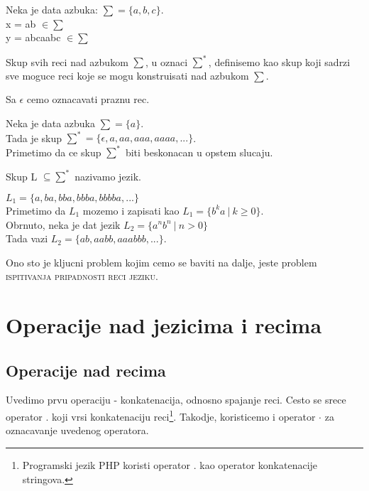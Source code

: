 \documentclass{memoir}
\begin{document}
\begin{primer}
Neka je data azbuka: $\sum = \{a, b, c \}$. \\
x = ab $\in \sum$ \\
y = abcaabc $\in \sum$ \\
\end{primer}

\begin{definicija}
 Skup svih reci nad azbukom $\sum$, u oznaci $\sum^*$, definisemo kao skup koji sadrzi sve moguce
 reci koje se mogu konstruisati nad azbukom $\sum$. 
\end{definicija}

Sa $\epsilon$ cemo oznacavati praznu rec.

\begin{primer}
 Neka je data azbuka $\sum = \{a\}$. \\
 Tada je skup $\sum^* = \{\epsilon, a, aa, aaa, aaaa, ... \}$.\\
 Primetimo da ce skup $\sum^*$ biti beskonacan u opstem slucaju.
\end{primer}

\begin{definicija}
 Skup L $\subseteq \sum^*$ nazivamo jezik.
\end{definicija}

\begin{primer}
 $L_1 = \{a, ba, bba, bbba, bbbba, ... \}$ \\
 Primetimo da $L_1$ mozemo i zapisati kao $L_1 = \{b^ka \ | \ k \ge 0 \}$. \\
 Obrnuto, neka je dat jezik $L_2 = \{ a^nb^n \ | \ n > 0\}$ \\
 Tada vazi $L_2 = \{ab, aabb, aaabbb, ... \}$.
\end{primer}

Ono sto je kljucni problem kojim cemo se baviti na dalje, jeste problem \textsc{ispitivanja pripadnosti reci jeziku}. 

\section{Operacije nad jezicima i recima}
\subsection{Operacije nad recima}
Uvedimo prvu operaciju - konkatenacija, odnosno spajanje reci. Cesto se srece operator $.$ koji vrsi konkatenaciju reci\footnote{Programski jezik PHP koristi operator $.$ 
kao operator konkatenacije stringova.}. Takodje, koristicemo i operator $\cdot$ za oznacavanje uvedenog operatora.
\end{document}

